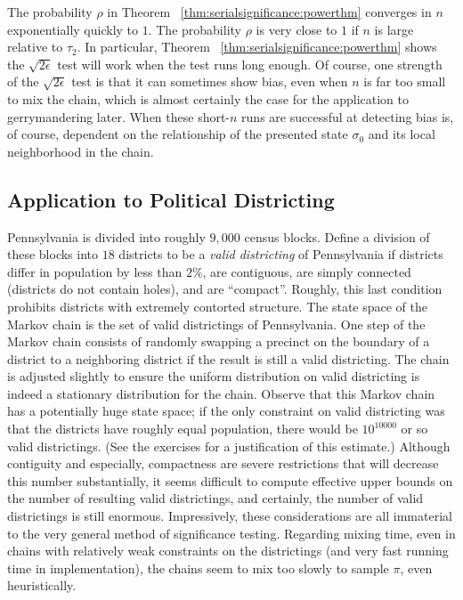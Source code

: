 \documentclass[12pt]{article}
\begin{document}
\begin{remark}
    The probability \( \rho \) in Theorem~%
    \ref{thm:serialsignificance:powerthm} converges in \( n \) exponentially
    quickly to \( 1 \).  The probability \( \rho \) is very close to \( 1
    \) if \( n \) is large relative to \( \tau_2 \).  In particular,
    Theorem~%
    \ref{thm:serialsignificance:powerthm} shows the \( \sqrt{2\epsilon} \) test
    will work when the test runs long enough.  Of course, one strength
    of the \( \sqrt{2\epsilon} \) test is that it can sometimes show
    bias, even when \( n \) is far too small to mix the chain, which is
    almost certainly the case for the application to gerrymandering
    later.  When these short-\( n \) runs are successful at detecting
    bias is, of course, dependent on the relationship of the presented
    state \( \sigma_0 \) and its local neighborhood in the chain.
\end{remark}

\subsection*{Application to Political Districting}

Pennsylvania is divided into roughly \( 9,000 \) census blocks.  Define
a division of these blocks into \( 18 \) districts to be a \emph{valid
districting} of Pennsylvania if districts differ in population by less
than \( 2\% \), are contiguous, are simply connected (districts do not
contain holes), and are ``compact''.  Roughly, this last condition
prohibits districts with extremely contorted structure.  The state space
of the Markov chain is the set of valid districtings of Pennsylvania.
One step of the Markov chain consists of randomly swapping a precinct on
the boundary of a district to a neighboring district if the result is
still a valid districting.  The chain is adjusted slightly to ensure the
uniform distribution on valid districting is indeed a stationary
distribution for the chain.  Observe that this Markov chain has a
potentially huge state space; if the only constraint on valid
districting was that the districts have roughly equal population, there
would be \( 10^{10000} \) or so valid districtings.  (See the exercises
for a justification of this estimate.) Although contiguity and
especially, compactness are severe restrictions that will decrease this
number substantially, it seems difficult to compute effective upper
bounds on the number of resulting valid districtings, and certainly, the
number of valid districtings is still enormous.  Impressively, these
considerations are all immaterial to the very general method of
significance testing.  Regarding mixing time, even in chains with
relatively weak constraints on the districtings (and very fast running
time in implementation), the chains seem to mix too slowly to sample \( \pi \),
even heuristically.
\end{document}
